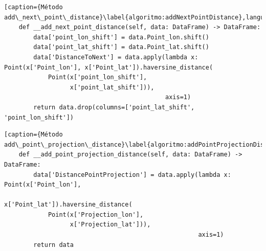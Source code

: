 \begin{lstlisting}[caption={Método add\_next\_point\_distance}\label{algoritmo:addNextPointDistance},language=Python] 
    def __add_next_point_distance(self, data: DataFrame) -> DataFrame:
        data['point_lon_shift'] = data.Point_lon.shift()
        data['point_lat_shift'] = data.Point_lat.shift()
        data['DistanceToNext'] = data.apply(lambda x: Point(x['Point_lon'], x['Point_lat']).haversine_distance(
            Point(x['point_lon_shift'],
                  x['point_lat_shift'])),
                                            axis=1)
        return data.drop(columns=['point_lat_shift', 'point_lon_shift'])
\end{lstlisting}


\begin{lstlisting}[caption={Método add\_point\_projection\_distance}\label{algoritmo:addPointProjectionDistance},language=Python] 
    def __add_point_projection_distance(self, data: DataFrame) -> DataFrame:
        data['DistancePointProjection'] = data.apply(lambda x: Point(x['Point_lon'],
                                                                     x['Point_lat']).haversine_distance(
            Point(x['Projection_lon'],
                  x['Projection_lat'])),
                                                     axis=1)
        return data
\end{lstlisting}



